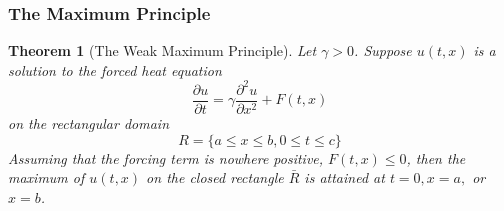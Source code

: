 \documentclass{article}
\newcommand{\pd}[2]{\frac{\partial #1}{\partial #2}}
\newcommand{\pdt}[2]{\frac{\partial ^2 #1}{\partial #2 ^2}}
\newtheorem{theorem}{Theorem}[section]
\theoremstyle{definition}
\begin{document}
\subsubsection{The Maximum Principle}
\begin{theorem}[The Weak Maximum Principle]
    Let $\gamma >0$. Suppose $u(t,x)$ is a solution to the forced heat equation 
    \begin{equation*}
        \pd{u}{t} = \gamma \pdt{u}{x} + F(t,x)
    \end{equation*}
    on the rectangular domain 
    \begin{equation*}
        R=\{a\leq x \leq b, 0 \leq t \leq c \}
    \end{equation*}
    Assuming that the forcing term is nowhere positive, $F(t,x) \leq 0$, then the maximum of $u(t,x)$ on the closed rectangle $\bar{R}$ is attained at $t=0, x=a,$ or $x=b$.
\end{theorem}
\end{document}
